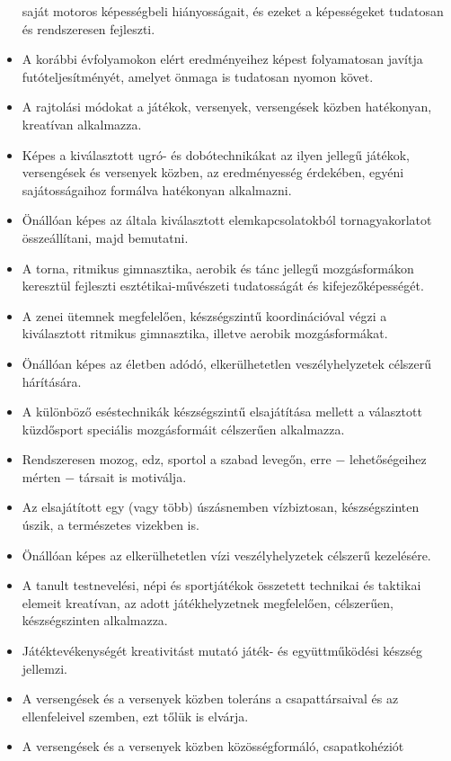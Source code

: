 \begin{itemize}
  saját motoros képességbeli hiányosságait, és ezeket a képességeket
  tudatosan és rendszeresen fejleszti.
\item
  A korábbi évfolyamokon elért eredményeihez képest folyamatosan javítja
  futóteljesítményét, amelyet önmaga is tudatosan nyomon követ.
\item
  A rajtolási módokat a játékok, versenyek, versengések közben
  hatékonyan, kreatívan alkalmazza.
\item
  Képes a kiválasztott ugró- és dobótechnikákat az ilyen jellegű
  játékok, versengések és versenyek közben, az eredményesség érdekében,
  egyéni sajátosságaihoz formálva hatékonyan alkalmazni.
\item
  Önállóan képes az általa kiválasztott elemkapcsolatokból
  tornagyakorlatot összeállítani, majd bemutatni.
\item
  A torna, ritmikus gimnasztika, aerobik és tánc jellegű mozgásformákon
  keresztül fejleszti esztétikai-művészeti tudatosságát és
  kifejezőképességét.
\item
  A zenei ütemnek megfelelően, készségszintű koordinációval végzi a
  kiválasztott ritmikus gimnasztika, illetve aerobik mozgásformákat.
\item
  Önállóan képes az életben adódó, elkerülhetetlen veszélyhelyzetek
  célszerű hárítására.
\item
  A különböző eséstechnikák készségszintű elsajátítása mellett a
  választott küzdősport speciális mozgásformáit célszerűen alkalmazza.
\item
  Rendszeresen mozog, edz, sportol a szabad levegőn, erre −
  lehetőségeihez mérten − társait is motiválja.
\item
  Az elsajátított egy (vagy több) úszásnemben vízbiztosan,
  készségszinten úszik, a természetes vizekben is.
\item
  Önállóan képes az elkerülhetetlen vízi veszélyhelyzetek célszerű
  kezelésére.
\item
  A tanult testnevelési, népi és sportjátékok összetett technikai és
  taktikai elemeit kreatívan, az adott játékhelyzetnek megfelelően,
  célszerűen, készségszinten alkalmazza.
\item
  Játéktevékenységét kreativitást mutató játék- és együttműködési
  készség jellemzi.
\item
  A versengések és a versenyek közben toleráns a csapattársaival és az
  ellenfeleivel szemben, ezt tőlük is elvárja.
\item
  A versengések és a versenyek közben közösségformáló, csapatkohéziót

\end{itemize}
